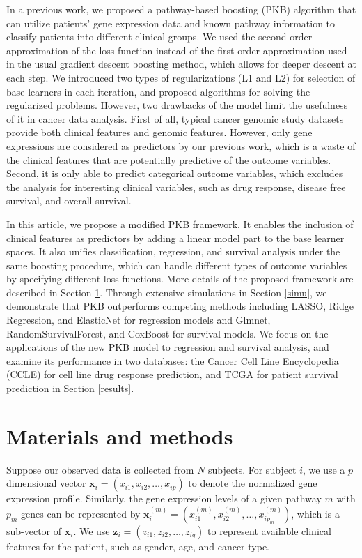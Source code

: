 \documentclass[a4paper,12pt]{article}
\newcommand{\bd}[1]{\mathbf{#1}}
\newcommand{\pathexpr}[3]{{#1}_{#2}^{(#3)}}
\begin{document}
In a previous work,\cite{zeng2019pathway} we proposed a pathway-based boosting (PKB) algorithm that can utilize patients' gene expression data and known pathway information to classify patients into different clinical groups. We used the second order approximation of the loss function instead of the first order approximation used in the usual gradient descent boosting method, which allows for deeper descent at each step. We introduced two types of regularizations (L1 and L2) for selection of base learners in each iteration, and proposed algorithms for solving the regularized problems. However, two drawbacks of the model limit the usefulness of it in cancer data analysis. First of all, typical cancer genomic study datasets provide both clinical features and genomic features. However, only gene expressions are considered as predictors by our previous work, which is a waste of the clinical features that are potentially predictive of the outcome variables. Second, it is only able to predict categorical outcome variables, which excludes the analysis for interesting clinical variables, such as drug response, disease free survival, and overall survival. 
	
In this article, we propose a modified PKB framework. It enables the inclusion of clinical features as predictors by adding a linear model part to the base learner spaces. It also unifies classification, regression, and survival analysis under the same boosting procedure, which can handle different types of outcome variables by specifying different loss functions. More details of the proposed framework are described in Section \ref{methods}. Through extensive simulations in Section \ref{simu}, we demonstrate that PKB outperforms competing methods including LASSO,\cite{tibshirani1996regression} Ridge Regression,\cite{hoerl1970ridge} and ElasticNet\cite{zou2005regularization} for regression models and Glmnet,\cite{simon2011regularization} RandomSurvivalForest,\cite{ishwaran2008random} and CoxBoost\cite{binder2013coxboost} for survival models. We focus on the applications of the new PKB model to regression and survival analysis, and examine its performance in two databases:  the Cancer Cell Line Encyclopedia (CCLE) for cell line drug response prediction, and TCGA for patient survival prediction in Section \ref{results}.
	\section{Materials and methods}\label{methods}
	Suppose our observed data is collected from $N$ subjects. For subject $i$, we use a $p$ dimensional vector $\bd{x}_i = (x_{i1}, x_{i2}, \ldots, x_{ip})$ to denote the normalized gene expression profile. Similarly, the gene expression levels of a given pathway $m$ with $p_m$ genes can be represented by $\pathexpr{\bd{x}}{i}{m} = (\pathexpr{x}{i1}{m},\pathexpr{x}{i2}{m}, \ldots, \pathexpr{x}{ip_m}{m})$, which is a sub-vector of $\bd{x}_i$. We use $\bd{z}_i = (z_{i1}, z_{i2}, \ldots, z_{iq})$ to represent available clinical features for the patient, such as gender, age, and cancer type.
	
\end{document}
